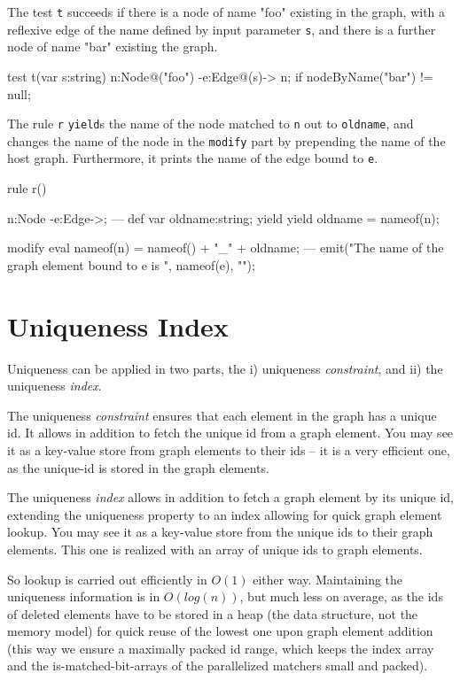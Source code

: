\begin{example}
The test \texttt{t} succeeds if there is a node of name "foo" existing in the graph, with a reflexive edge of the name defined by input parameter \texttt{s}, and there is a further node of name "bar" existing the graph.

\begin{grgen}
test t(var s:string) {
  n:Node{@("foo")} -e:Edge{@(s)}-> n;
  if{ nodeByName("bar") != null; }
}
\end{grgen}

The rule \texttt{r} \texttt{yield}s the name of the node matched to \texttt{n} out to \texttt{oldname}, and changes the name of the node in the \texttt{modify} part by prepending the name of the host graph. Furthermore, it prints the name of the edge bound to \texttt{e}.

\begin{grgen}
rule r() {
  n:Node -e:Edge->;
---
  def var oldname:string;
  yield { yield oldname = nameof(n); }
		
  modify {
    eval {
      nameof(n) = nameof() + "_" + oldname;
    }
  ---
    emit("The name of the graph element bound to e is ", nameof(e), "\n");
  }
}
\end{grgen}

\end{example}


\section{Uniqueness Index}\label{sec:uniqueness}
Uniqueness can be applied in two parts, the i) uniqueness \emph{constraint}, and ii) the uniqueness \emph{index}.

The uniqueness \emph{constraint} ensures that each element in the graph has a unique id. 
It allows in addition to fetch the unique id from a graph element.
You may see it as a key-value store from graph elements to their ids -- it is a very efficient one, as the unique-id is stored in the graph elements. 

The uniqueness \emph{index} allows in addition to fetch a graph element by its unique id, extending the uniqueness property to an index allowing for quick graph element lookup.
You may see it as a key-value store from the unique ids to their graph elements.
This one is realized with an array of unique ids to graph elements.

So lookup is carried out efficiently in $O(1)$ either way.
Maintaining the uniqueness information is in $O(log(n))$, but much less on average, as the ids of deleted elements have to be stored in a heap (the data structure, not the memory model) for quick reuse of the lowest one upon graph element addition (this way we ensure a maximally packed id range, which keeps the index array and the is-matched-bit-arrays of the parallelized matchers small and packed).

